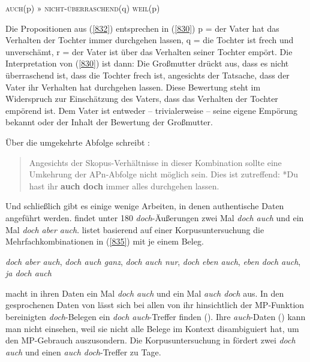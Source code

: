 \begin{exe}
	\ex\label{834}
	\textsc{auch}(p) » \textsc{nicht-überraschend}(q) \textsc{weil}(p)\hfill\hbox{\citet[134/136]{Rinas2007}}	
\end{exe}
Die Propositionen aus (\ref{832}) entsprechen in (\ref{830}) p = der Vater hat das Verhalten der Tochter immer durchgehen lassen, q = die Tochter ist frech und unverschämt, r = der Vater ist über das Verhalten seiner Tochter empört. Die Interpretation von (\ref{830}) ist dann: Die Großmutter drückt aus, dass es nicht überraschend ist, dass die Tochter frech ist, angesichts der Tatsache, dass der Vater ihr Verhalten hat durchgehen lassen. Diese Bewertung steht im Widerspruch zur Einschätzung des Vaters, dass das Verhalten der Tochter empörend ist. Dem Vater ist entweder -- trivialerweise -- seine eigene Empörung bekannt oder der Inhalt der Bewertung der Großmutter.

Über die umgekehrte Abfolge schreibt \citet[149]{Rinas2007}:
\begin{quotation}
Angesichts der Skopus-Verhältnisse in dieser Kombination sollte eine Um\-kehrung der APn-Abfolge nicht möglich sein. Dies ist zutreffend: *Du hast ihr \textbf{auch doch} immer alles durchgehen lassen.
\end{quotation}
Und schließlich gibt es einige wenige Arbeiten, in denen authentische Daten angeführt werden. \citet[233]{Rath1975} findet unter 180 \textit{doch}-Äußerungen zwei Mal \textit{doch auch} und ein Mal \textit{doch aber auch}. \citet[53]{Rudolph1983} listet basierend auf einer Korpusuntersuchung die Mehrfachkombinationen in (\ref{835}) mit je einem Beleg.
			
\begin{exe}
	\ex\label{835}
	\textit{doch aber auch}, \textit{doch auch ganz}, \textit{doch auch nur}, \textit{doch eben auch}, \textit{eben doch auch}, \textit{ja doch auch}
\end{exe}					
\citet[254]{Hentschel1986} macht in ihren Daten ein Mal \textit{doch auch} und ein Mal \textit{auch doch} aus. In den gesprochenen Daten von \citet{Moellering2004} lässt sich bei allen von ihr hinsichtlich der MP-Funktion bereinigten \textit{doch}-Belegen ein \textit{doch auch}-Treffer finden (\citeyear[256]{Moellering2004}). Ihre \textit{auch}-Daten (\citeyear[450]{Moellering2004}) kann man nicht einsehen, weil sie nicht alle Belege im Kontext disambiguiert hat, um den MP-Gebrauch auszusondern. Die Korpusuntersuchung in \citet{Braber2010} fördert zwei \textit{doch auch} und einen \textit{auch doch}-Treffer zu Tage.

